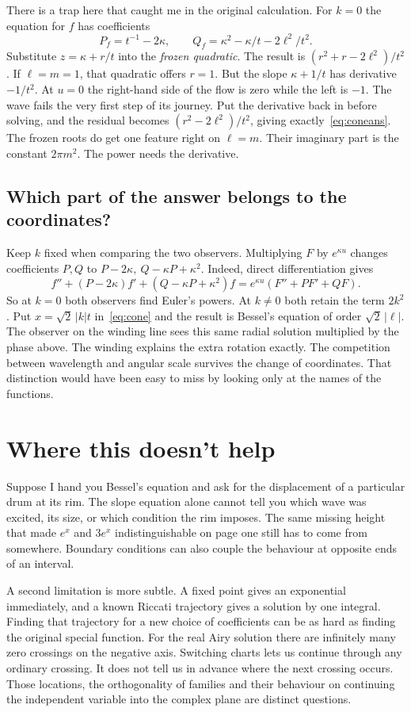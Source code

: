 \documentclass[11pt,a4paper]{amsart}
\theoremstyle{definition}
\theoremstyle{remark}
\begin{document}
There is a trap here that caught me in the original calculation. For \(k=0\) the equation for \(f\) has coefficients
\[
 P_f=t^{-1}-2\kappa,\qquad Q_f=\kappa^2-\kappa/t-2\ell^2/t^2 .
\]
Substitute \(z=\kappa+r/t\) into the \emph{frozen quadratic}. The result is \((r^2+r-2\ell^2)/t^2\). If \(\ell=m=1\), that quadratic offers \(r=1\). But the slope \(\kappa+1/t\) has derivative \(-1/t^2\). At \(u=0\) the right-hand side of the flow is zero while the left is \(-1\). The wave fails the very first step of its journey. Put the derivative back in before solving, and the residual becomes \((r^2-2\ell^2)/t^2\), giving exactly~\eqref{eq:coneans}. The frozen roots do get one feature right on \(\ell=m\). Their imaginary part is the constant \(2\pi m^2\). The power needs the derivative.

\subsection{Which part of the answer belongs to the coordinates?}
Keep \(k\) fixed when comparing the two observers. Multiplying \(F\) by \(e^{\kappa u}\) changes coefficients \(P,Q\) to \(P-2\kappa,\ Q-\kappa P+\kappa^2\). Indeed, direct differentiation gives
\[
 f''+(P-2\kappa)f'+(Q-\kappa P+\kappa^2)f
   =e^{\kappa u}(F''+PF'+QF).
\]
So at \(k=0\) both observers find Euler's powers. At \(k\ne0\) both retain the term \(2k^2\). Put \(x=\sqrt2\,|k|t\) in~\eqref{eq:cone} and the result is Bessel's equation of order \(\sqrt2\,|\ell|\). The observer on the winding line sees this same radial solution multiplied by the phase above. The winding explains the extra rotation exactly. The competition between wavelength and angular scale survives the change of coordinates. That distinction would have been easy to miss by looking only at the names of the functions.

\section{Where this doesn't help}
Suppose I hand you Bessel's equation and ask for the displacement of a particular drum at its rim. The slope equation alone cannot tell you which wave was excited, its size, or which condition the rim imposes. The same missing height that made \(e^x\) and \(3e^x\) indistinguishable on page one still has to come from somewhere. Boundary conditions can also couple the behaviour at opposite ends of an interval.

A second limitation is more subtle. A fixed point gives an exponential immediately, and a known Riccati trajectory gives a solution by one integral. Finding that trajectory for a new choice of coefficients can be as hard as finding the original special function. For the real Airy solution there are infinitely many zero crossings on the negative axis. Switching charts lets us continue through any ordinary crossing. It does not tell us in advance where the next crossing occurs. Those locations, the orthogonality of families and their behaviour on continuing the independent variable into the complex plane are distinct questions.
\end{document}

